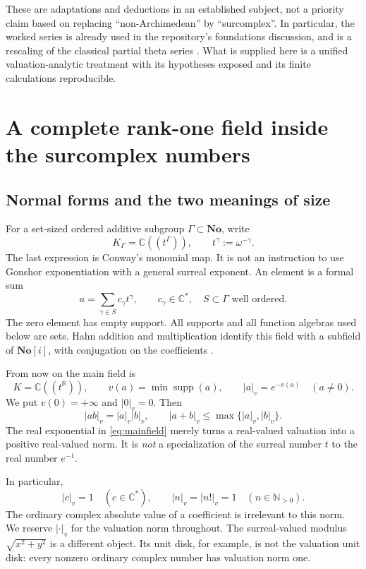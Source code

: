 \documentclass[11pt,a4paper]{article}
\numberwithin{equation}{section}
\theoremstyle{definition}
\theoremstyle{remark}
\newcommand{\No}{\mathbf{No}}
\newcommand{\C}{\mathbb C}
\newcommand{\R}{\mathbb R}
\newcommand{\N}{\mathbb N}
\newcommand{\vabs}[1]{\lvert#1\rvert_v}
\newcommand{\supp}{\operatorname{supp}}
\begin{document}
These are adaptations and deductions in an established subject, not a priority
claim based on replacing ``non-Archimedean'' by ``surcomplex''. In particular,
the worked series is already used in the repository's foundations discussion,
and is a rescaling of the classical partial theta series \cite{RepoFoundations,Sokal}.
What is supplied here is a unified valuation-analytic treatment with its
hypotheses exposed and its finite calculations reproducible.

\section{A complete rank-one field inside the surcomplex numbers}
\label{sec:field}

\subsection{Normal forms and the two meanings of size}
For a set-sized ordered additive subgroup $\Gamma\subset\No$, write
\[
 K_\Gamma=\C((t^\Gamma)),\qquad t^\gamma:=\omega^{-\gamma}.
\]
The last expression is Conway's monomial map. It is not an instruction to use
Gonshor exponentiation with a general surreal exponent. An element is a formal
sum
\begin{equation}\label{eq:hahn}
 a=\sum_{\gamma\in S}c_\gamma t^\gamma,
 \qquad c_\gamma\in\C^*,\quad S\subset\Gamma\text{ well ordered}.
\end{equation}
The zero element has empty support. All supports and all function algebras used
below are sets. Hahn addition and multiplication identify this field with a
subfield of $\No[i]$, with conjugation on the coefficients
\cite{RepoAnalysis,Poonen}.

From now on the main field is
\begin{equation}\label{eq:mainfield}
 K=\C((t^\R)),\qquad
 v(a)=\min\supp(a),\qquad
 \vabs{a}=e^{-v(a)}\quad(a\ne0).
\end{equation}
We put $v(0)=+\infty$ and $\vabs0=0$. Then
\[
 \vabs{ab}=\vabs a\vabs b,
 \qquad \vabs{a+b}\le\max\{\vabs a,\vabs b\}.
\]
The real exponential in \eqref{eq:mainfield} merely turns a real-valued
valuation into a positive real-valued norm. It is \emph{not} a specialization
of the surreal number $t$ to the real number $e^{-1}$.

In particular,
\begin{equation}\label{eq:trivialconstants}
 \vabs c=1\quad(c\in\C^*),\qquad
 \vabs n=\vabs{n!}=1\quad(n\in\N_{>0}).
\end{equation}
The ordinary complex absolute value of a coefficient is irrelevant to this
norm. We reserve $\vabs{\cdot}$ for the valuation norm throughout. The
surreal-valued modulus $\sqrt{x^2+y^2}$ is a different object. Its unit disk,
for example, is not the valuation unit disk: every nonzero ordinary complex
number has valuation norm one.
\end{document}
